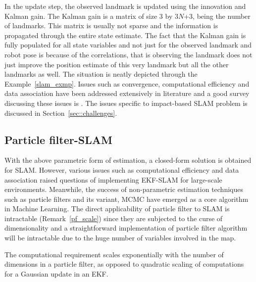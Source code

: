 In the update step, the observed landmark is updated using the innovation and Kalman gain. The Kalman gain is a matrix of size 3 by 3$N$+3,  being the number of landmarks. This matrix is usually not sparse and the information is propagated through the entire state estimate. The fact that the Kalman gain is fully populated for all state variables and not just for the observed landmark and robot pose is because of the correlations, that is observing the landmark does not just improve the position estimate of this very landmark but all the other landmarks as well. The situation is neatly depicted through the Example~\ref{slam_exmp}. Issues such as convergence, computational efficiency and data association have been addressed extensively in literature and a good survey discussing these issues is \cite{bailey2006simultaneous}. The issues specific to impact-based SLAM problem is discussed in Section~\ref{sec::challenges}.

\subsection{Particle filter-SLAM} \label{sec::pfslam}
With the above parametric form of estimation, a closed-form solution is obtained for SLAM. However, various issues such as computational efficiency and data association raised questions of implementing EKF-SLAM for large-scale environments. Meanwhile, the success of non-parametric estimation techniques such as particle filters and its variant, \acf{MCMC} have emerged as a core algorithm in Machine Learning. The direct applicability of particle filter to SLAM is intractable (Remark~\ref{pf_scale}) since they are subjected to the curse of dimensionality and a straightforward implementation of particle filter algorithm will be intractable due to the huge number of variables involved in the map. 
\begin{rem}
The computational requirement scales exponentially with the number of dimensions in a particle filter, as opposed to quadratic scaling of computations for a Gaussian update in an EKF. 
\label{pf_scale} 
\end{rem}

